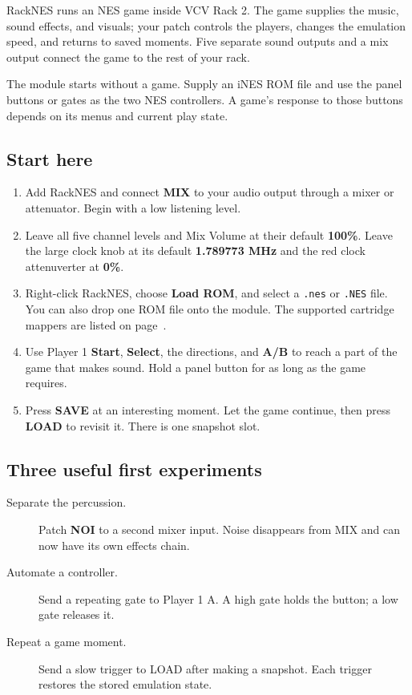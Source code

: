 RackNES runs an NES game inside VCV Rack 2. The game supplies the music,
sound effects, and visuals; your patch controls the players, changes the
emulation speed, and returns to saved moments. Five separate sound outputs
and a mix output connect the game to the rest of your rack.

The module starts without a game. Supply an iNES ROM file and use the panel
buttons or gates as the two NES controllers. A game's response to those
buttons depends on its menus and current play state.

\subsection{Start here}
\begin{enumerate}
\item Add RackNES and connect \textbf{MIX} to your audio output through a
mixer or attenuator. Begin with a low listening level.
\item Leave all five channel levels and Mix Volume at their default
\textbf{100\%}. Leave the large clock knob at its default
\textbf{1.789773 MHz} and the red clock attenuverter at \textbf{0\%}.
\item Right-click RackNES, choose \textbf{Load ROM}, and select a
\texttt{.nes} or \texttt{.NES} file. You can also drop one ROM file onto the
module. The supported cartridge mappers are listed on page~\pageref{sec:roms}.
\item Use Player 1 \textbf{Start}, \textbf{Select}, the directions, and
\textbf{A/B} to reach a part of the game that makes sound. Hold a panel
button for as long as the game requires.
\item Press \textbf{SAVE} at an interesting moment. Let the game continue,
then press \textbf{LOAD} to revisit it. There is one snapshot slot.
\end{enumerate}

\subsection{Three useful first experiments}
\begin{description}
\item[Separate the percussion.] Patch \textbf{NOI} to a second mixer input.
Noise disappears from MIX and can now have its own effects chain.
\item[Automate a controller.] Send a repeating gate to Player 1 A.
A high gate holds the button; a low gate releases it.
\item[Repeat a game moment.] Send a slow trigger to LOAD after making a
snapshot. Each trigger restores the stored emulation state.
\end{description}

